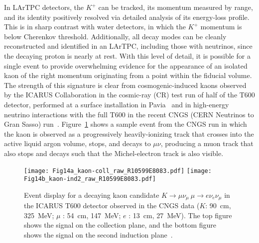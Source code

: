 In LArTPC detectors, the $K^+$ can be tracked, its momentum measured
by range, and its identity positively resolved via detailed analysis
of its energy-loss profile.  This is in sharp contrast with water 
detectors, in which the $K^+$ momentum is below Cherenkov threshold.
Additionally, all decay modes can be cleanly reconstructed 
and identified in an LArTPC, including those with neutrinos,
since the decaying proton is nearly at rest.  With this level of
detail, it is possible for a single event to provide overwhelming
evidence for the appearance of an isolated kaon of the right momentum
originating from a point within the fiducial volume.  The strength of
this signature is clear from cosmogenic-induced kaons observed by the
ICARUS Collaboration in the cosmic-ray (CR) test run of half of the T600
detector, performed at a surface installation in Pavia~\cite{Amerio:2004ze} 
and in high-energy neutrino interactions with the full T600 in the recent 
CNGS (CERN Neutrinos to Gran Sasso) run~\cite{Antonello:2012hu}.
Figure~\ref{fig:icaruskaon} shows a sample event from the CNGS run in
which the kaon is observed as a progressively heavily-ionizing track 
that crosses into the active liquid argon volume, stops, and
decays to $\mu\nu$, producing a muon track that also stops and decays
such that the Michel-electron track is also visible. 
%
\begin{figure}[!htb]
\centering
\texttt{[image: Fig14a\_kaon-coll\_raw\_R10599E8083.pdf]}
\texttt{[image: Fig14b\_kaon-ind2\_raw\_R10599E8083.pdf]}
\caption[Decaying kaon observed during the ICARUS run at CNGS]
{Event display for a decaying kaon candidate $K \rightarrow \mu \nu_\mu \ \mu \rightarrow e \nu_e \nu_\mu$ 
in the ICARUS T600 detector observed
in the CNGS data ($K$: \SI{90}{\cm}, \SI{325}{\MeV}; $\mu$ : \SI{54}{\cm}, \SI{147}{\MeV}; 
$e$ : \SI{13}{\cm}, \SI{27}{\MeV}). The top figure shows the signal on the collection plane,
  and the bottom figure shows the signal on the second induction plane~\cite{Antonello:2012hu}.}
\label{fig:icaruskaon}
\end{figure}

